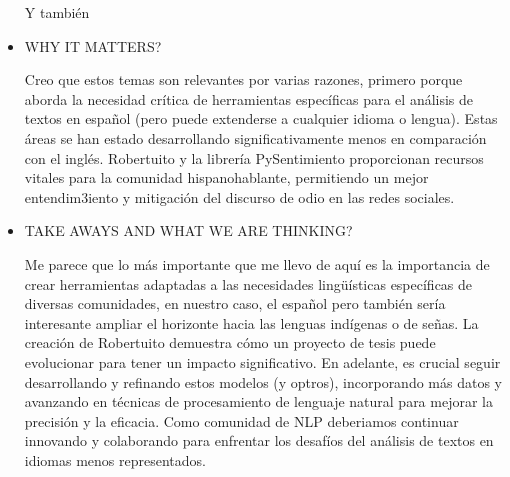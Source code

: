 \documentclass[letter, 11pt, twoside]{report}
\begin{document}
\begin{itemize}
    Y también 
    \item WHY IT MATTERS?
    
    Creo que estos temas son relevantes por varias razones, primero porque aborda la necesidad crítica de herramientas específicas para el análisis de textos en español (pero puede extenderse a cualquier idioma o lengua). Estas áreas se han estado desarrollando  significativamente menos en comparación con el inglés. Robertuito y la librería PySentimiento proporcionan recursos vitales para la comunidad hispanohablante, permitiendo un mejor entendim3iento y mitigación del discurso de odio en las redes sociales.

    \item TAKE AWAYS AND WHAT WE ARE THINKING?
    
    Me parece que lo más importante que me llevo de aquí es la importancia de crear herramientas adaptadas a las necesidades lingüísticas específicas de diversas comunidades, en nuestro caso, el español pero también sería interesante ampliar el horizonte hacia las lenguas indígenas o de señas. La creación de Robertuito demuestra cómo un proyecto de tesis puede evolucionar para tener un impacto significativo. En adelante, es crucial seguir desarrollando y refinando estos modelos (y optros), incorporando más datos y avanzando en técnicas de procesamiento de lenguaje natural para mejorar la precisión y la eficacia. Como comunidad de NLP deberiamos continuar innovando y colaborando para enfrentar los desafíos del análisis de textos en idiomas menos representados.
\end{itemize}

  




\end{document}
